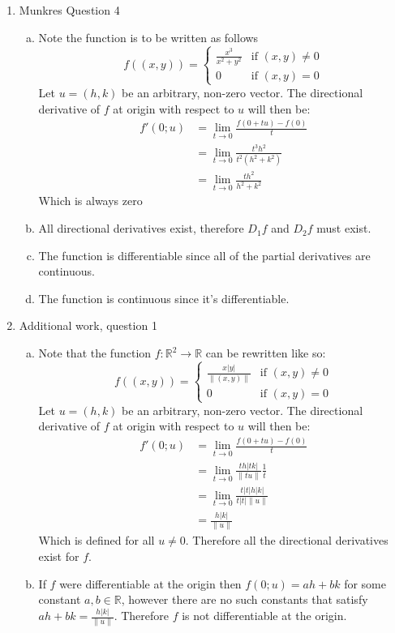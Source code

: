 \documentclass[letterpaper,10pt]{article}
\begin{document}
\begin{enumerate}
	\item Munkres Question 4
	\begin{enumerate}[a)]
		\item Note the function is to be written as follows
		\[
		 f((x,y)) =
		  \begin{cases}
		   \frac{x^3}{x^2 + y^2} & \text{if } (x, y) \neq 0 \\
		   0       & \text{if } (x, y) = 0
		  \end{cases}
		\]
		Let $u = (h, k)$ be an arbitrary, non-zero vector. The directional derivative of $f$ at origin with respect to $u$ will then be:
		\begin{align*}
			f'(0; u) & =  \lim_{t \to 0} \frac{f(0 + tu) - f(0)}{t} \\
			& =  \lim_{t \to 0} \frac{t^3 h^2}{t^2(h^2 + k^2)} \\
			& =  \lim_{t \to 0} \frac{t h^2}{h^2 + k^2}
		\end{align*}
		Which is always zero
		\item All directional derivatives exist, therefore $D_1 f$ and $D_2 f$ must exist.
		\item The function is differentiable since all of the partial derivatives are continuous.
		\item The function is continuous since it's differentiable.
	\end{enumerate}

	\item Additional work, question 1
	\begin{enumerate}[a)]
		\item Note that the function $f:\mathbb{R}^2 \to \mathbb{R}$ can be rewritten like so:
		\[
		 f((x,y)) =
		  \begin{cases}
		   \frac{x|y|}{\|(x,y)\|} & \text{if } (x, y) \neq 0 \\
		   0       & \text{if } (x, y) = 0
		  \end{cases}
		\]
		Let $u = (h, k)$ be an arbitrary, non-zero vector. The directional derivative of $f$ at origin with respect to $u$ will then be:
		\begin{align*}
			f'(0; u) & =  \lim_{t \to 0} \frac{f(0 + tu) - f(0)}{t} \\
			& =  \lim_{t \to 0} \frac{t h |t k|}{\|tu\|}\frac{1}{t} \\
			& =  \lim_{t \to 0} \frac{t |t| h |k|}{t|t|\|u\|} \\
			& =  \frac{h |k|}{\|u\|}
		\end{align*}
		Which is defined for all $u \neq 0$. Therefore all the directional derivatives exist for $f$.
		\item If $f$ were differentiable at the origin then $f(0; u) = ah + bk$ for some constant $a,b \in \mathbb{R}$, however there are no such constants that satisfy $ah + bk = \frac{h |k|}{\|u\|}$. Therefore $f$ is not differentiable at the origin.
	\end{enumerate}


\end{enumerate}
\end{document}
